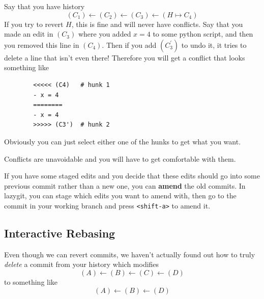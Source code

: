 \documentclass{article}
\begin{document}
    \begin{example}
      Say that you have history
      \begin{equation}
        (C_1) \leftarrow (C_2) \leftarrow (C_3) \leftarrow (H \mapsto C_4)
      \end{equation} 
      If you try to revert $H$, this is fine and will never have conflicts. Say that you made an edit in $(C_3)$ where you added $x = 4$ to some python script, and then you removed this line in $(C_4)$. Then if you add $(C_3^\prime)$ to undo it, it tries to delete a line that isn't even there! Therefore you will get a conflict that looks something like 
      \begin{lstlisting}
        <<<<< (C4)   # hunk 1 
        - x = 4 
        ========
        - x = 4
        >>>>> (C3')  # hunk 2
      \end{lstlisting}
      Obviously you can just select either one of the hunks to get what you want. 
    \end{example} 

    Conflicts are unavoidable and you will have to get comfortable with them.  

    \begin{definition}
      If you have some staged edits and you decide that these edits should go into some previous commit rather than a new one, you can \textbf{amend} the old commits. In lazygit, you can stage which edits you want to amend with, then go to the commit in your working branch and press \texttt{<shift-a>} to amend it. 
    \end{definition}

  \subsection{Interactive Rebasing} 

    Even though we can revert commits, we haven't actually found out how to truly \textit{delete} a commit from your history which modifies 
    \begin{equation}
      (A) \leftarrow (B) \leftarrow (C) \leftarrow (D)
    \end{equation} 
    to something like 
    \begin{equation}
      (A) \leftarrow (B) \leftarrow (D)
    \end{equation} 
  
\end{document}
